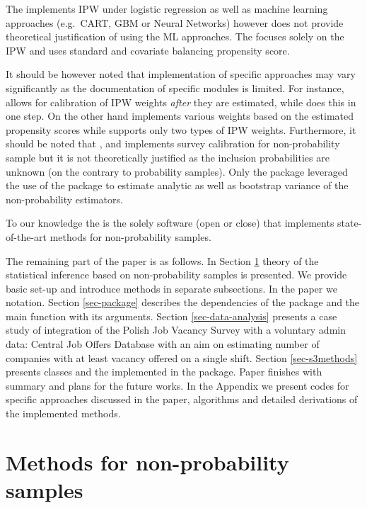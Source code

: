 \documentclass[
]{jss}
\begin{document}
The  implements IPW under logistic regression as well as
machine learning approaches (e.g.~CART, GBM or Neural Networks) however
does not provide theoretical justification of using the ML approaches.
The  focuses solely on the IPW and uses standard and
covariate balancing propensity score.

It should be however noted that implementation of specific approaches
may vary significantly as the documentation of specific modules is
limited. For instance,  allows for calibration of IPW
weights \textit{after} they are estimated, while  does
this in one step. On the other hand  implements various
weights based on the estimated propensity scores while 
supports only two types of IPW weights. Furthermore, it should be noted
that ,  and  implements survey
calibration for non-probability sample but it is not theoretically
justified as the inclusion probabilities are unknown (on the contrary to
probability samples). Only the  package leveraged the
use of the  package to estimate analytic as well as
bootstrap variance of the non-probability estimators.

To our knowledge the  is the solely software (open or
close) that implements state-of-the-art methods for non-probability
samples.

The remaining part of the paper is as follows. In Section
\ref{sec-methods} theory of the statistical inference based on
non-probability samples is presented. We provide basic set-up and
introduce methods in separate subsections. In the paper we
\citet{wu2022statistical} notation. Section \ref{sec-package} describes
the dependencies of the package and the main function with its
arguments. Section \ref{sec-data-analysis} presents a case study of
integration of the Polish Job Vacancy Survey with a voluntary admin
data: Central Job Offers Database with an aim on estimating number of
companies with at least vacancy offered on a single shift. Section
\ref{sec-s3methods} presents classes and the 
implemented in the package. Paper finishes with summary and plans for
the future works. In the Appendix we present codes for specific
approaches discussed in the paper, algorithms and detailed derivations
of the implemented methods.

\section{Methods for non-probability samples}\label{sec-methods}
\end{document}
